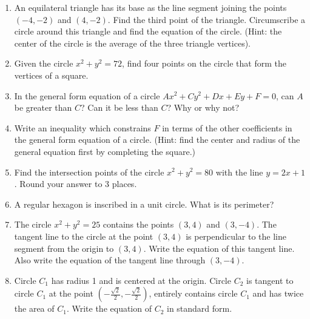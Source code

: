 \documentclass[
]{article}
\providecommand{\tightlist}{%
  \setlength{\itemsep}{0pt}\setlength{\parskip}{0pt}}
\def\tightlist{}
\begin{document}
\begin{enumerate}
\def\labelenumi{\arabic{enumi}.}
\setcounter{enumi}{14}
\tightlist
\item
  An equilateral triangle has its base as the line segment joining the
  points \((-4,-2)\) and \((4,-2)\). Find the third point of the
  triangle. Circumscribe a circle around this triangle and find the
  equation of the circle. (Hint: the center of the circle is the average
  of the three triangle vertices).
\item
  Given the circle \(x^2 + y^2 = 72\), find four points on the circle
  that form the vertices of a square.
\item
  In the general form equation of a circle \(Ax^2+Cy^2+Dx+Ey+F=0\), can
  \(A\) be greater than \(C\)? Can it be less than \(C\)? Why or why
  not?
\item
  Write an inequality which constrains \(F\) in terms of the other
  coefficients in the general form equation of a circle. (Hint: find the
  center and radius of the general equation first by completing the
  square.)
\item
  Find the intersection points of the circle \(x^2 + y^2 = 80\) with the
  line \(y=2x+1\). Round your answer to 3 places.
\item
  A regular hexagon is inscribed in a unit circle. What is its
  perimeter?
\item
  The circle \(x^2 + y^2 = 25\) contains the points \((3,4)\) and
  \((3,-4)\). The tangent line to the circle at the point \((3,4)\) is
  perpendicular to the line segment from the origin to \((3,4)\). Write
  the equation of this tangent line. Also write the equation of the
  tangent line through \((3,-4)\).
\item
  Circle \(C_1\) has radius 1 and is centered at the origin. Circle
  \(C_2\) is tangent to circle \(C_1\) at the point
  \((-\frac{\sqrt2}{2},-\frac{\sqrt2}{2})\), entirely contains circle
  \(C_1\) and has twice the area of \(C_1\). Write the equation of
  \(C_2\) in standard form.
\end{enumerate}
\end{document}
